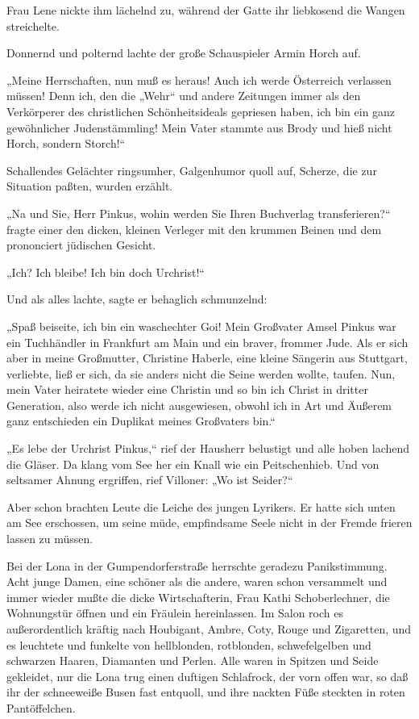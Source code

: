 Frau Lene nickte ihm lächelnd zu, während der Gatte ihr liebkosend
die Wangen streichelte.

Donnernd und polternd lachte der große Schauspieler Armin Horch
auf.

„Meine Herrschaften, nun muß es heraus! Auch ich werde Österreich
verlassen müssen! Denn ich, den die „Wehr“ und andere Zeitungen
immer als den Verkörperer des christlichen Schönheitsideals
gepriesen haben, ich bin ein ganz gewöhnlicher Judenstämmling! Mein
Vater stammte aus Brody und hieß nicht Horch, sondern Storch!“

Schallendes Gelächter ringsumher, Galgenhumor quoll auf, Scherze,
die zur Situation paßten, wurden erzählt.

„Na und Sie, Herr Pinkus, wohin werden Sie Ihren Buchverlag
transferieren?“ fragte einer den dicken, kleinen Verleger mit den
krummen Beinen und dem prononciert jüdischen Gesicht.

„Ich? Ich bleibe! Ich bin doch Urchrist!“

Und als alles lachte, sagte er behaglich schmunzelnd:

„Spaß beiseite, ich bin ein waschechter Goi! Mein
Großvater Amsel Pinkus war ein Tuchhändler in Frankfurt am Main und
ein braver, frommer Jude. Als er sich aber in meine Großmutter,
Christine Haberle, eine kleine Sängerin aus Stuttgart, verliebte,
ließ er sich, da sie anders nicht die Seine werden wollte, taufen.
Nun, mein Vater heiratete wieder eine Christin und so bin ich
Christ in dritter Generation, also werde ich nicht ausgewiesen,
obwohl ich in Art und Äußerem ganz entschieden ein Duplikat meines
Großvaters bin.“

„Es lebe der Urchrist Pinkus,“ rief der Hausherr belustigt und alle
hoben lachend die Gläser. Da klang vom See her ein Knall wie ein
Peitschenhieb. Und von seltsamer Ahnung ergriffen, rief Villoner:
„Wo ist Seider?“

Aber schon brachten Leute die Leiche des jungen Lyrikers. Er hatte
sich unten am See erschossen, um seine müde, empfindsame Seele
nicht in der Fremde frieren lassen zu müssen.

\tb{* * *}
Bei der Lona in der Gumpendorferstraße herrschte geradezu
Panikstimmung. Acht junge Damen, eine schöner als die andere, waren
schon versammelt und immer wieder mußte die dicke Wirtschafterin,
Frau Kathi Schoberlechner, die Wohnungstür öffnen und ein Fräulein
hereinlassen. Im Salon roch es außerordentlich kräftig nach
Houbigant, Ambre, Coty, Rouge und Zigaretten, und es leuchtete und
funkelte von hellblonden, rotblonden, schwefelgelben und schwarzen
Haaren, Diamanten und Perlen. Alle waren in  Spitzen
und Seide gekleidet, nur die Lona trug einen duftigen Schlafrock,
der vorn offen war, so daß ihr der schneeweiße Busen fast entquoll,
und ihre nackten Füße steckten in roten Pantöffelchen.

